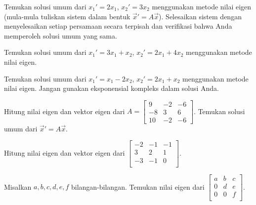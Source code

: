 \begin{exercise}
\leavevmode
\begin{tasks}
\task
Temukan solusi umum dari $x_1' = 2 x_1$, $x_2' = 3 x_2$ menggunakan
metode nilai eigen (mula-mula tuliskan sistem dalam bentuk
${\vec{x}}' = A \vec{x}$).
\task
Selesaikan sistem dengan menyelesaikan setiap persamaan
secara terpisah dan verifikasi bahwa Anda memperoleh solusi umum yang sama.
\end{tasks}
\end{exercise}

\begin{exercise}
Temukan solusi umum dari $x_1' = 3 x_1 + x_2$,
$x_2' = 2 x_1 + 4 x_2$ menggunakan metode nilai eigen.
\end{exercise}

\begin{exercise}
Temukan solusi umum dari $x_1' = x_1 -2 x_2$,
$x_2' = 2 x_1 + x_2$ menggunakan metode nilai eigen.
Jangan gunakan eksponensial kompleks dalam solusi Anda.
\end{exercise}

\begin{exercise}
\leavevmode
\begin{tasks}
\task
Hitung nilai eigen dan vektor eigen dari
$A = \left[ \begin{smallmatrix}
9 & -2 & -6 \\
-8 & 3 & 6 \\
10 & -2 & -6
\end{smallmatrix} \right]$.
\task
Temukan solusi umum dari ${\vec{x}}' = A \vec{x}$.
\end{tasks}
\end{exercise}

\begin{exercise}
Hitung nilai eigen dan vektor eigen dari
$\left[ \begin{smallmatrix}
-2 & -1 & -1 \\
3 & 2 & 1 \\
-3 & -1 & 0 \\
\end{smallmatrix} \right]$.
\end{exercise}

\begin{exercise}
Misalkan $a,b,c,d,e,f$ bilangan-bilangan.  Temukan nilai eigen dari
$\left[ \begin{smallmatrix}
a & b & c \\
0 & d & e \\
0 & 0 & f \\
\end{smallmatrix} \right]$.
\end{exercise}

